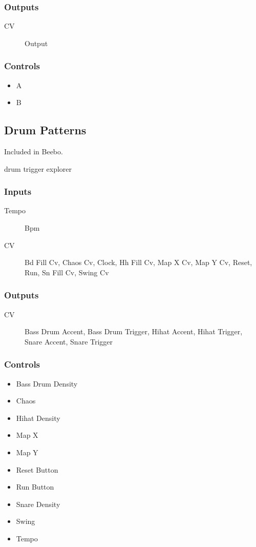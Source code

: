 \subsubsection{Outputs}
\begin{description}
\item [CV] Output
\end{description}

\subsubsection{Controls}
\begin{itemize}
\item A
\item B
\end{itemize}

\subsection{Drum Patterns}

Included in Beebo.

drum trigger explorer



\subsubsection{Inputs}
\begin{description}
\item [Tempo] Bpm
\item [CV] Bd Fill Cv, Chaos Cv, Clock, Hh Fill Cv, Map X Cv, Map Y Cv, Reset, Run, Sn Fill Cv, Swing Cv
\end{description}

\subsubsection{Outputs}
\begin{description}
\item [CV] Bass Drum Accent, Bass Drum Trigger, Hihat Accent, Hihat Trigger, Snare Accent, Snare Trigger
\end{description}

\subsubsection{Controls}
\begin{itemize}
\item Bass Drum Density
\item Chaos
\item Hihat Density
\item Map X
\item Map Y
\item Reset Button
\item Run Button
\item Snare Density
\item Swing
\item Tempo
\end{itemize}


